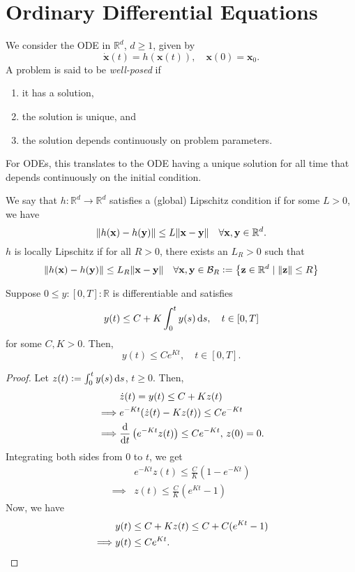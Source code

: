 \section{Ordinary Differential Equations}

We consider the ODE in $\mathbb{R}^d$, $d \geq 1$, given by
\[
    \dot{\mathbf{x}}(t) = h(\mathbf{x}(t)), \quad \mathbf{x}(0) = \mathbf{x}_0.
\]
A problem is said to be \emph{well-posed} if 
\begin{enumerate}
    \item it has a solution, 
    \item the solution is unique, and
    \item the solution depends continuously on problem parameters. 
\end{enumerate}

For ODEs, this translates to the ODE having a unique solution for all time that depends continuously on the initial condition.

\medskip

We say that $h \colon \mathbb{R}^d \to \mathbb{R}^d$ satisfies a (global) Lipschitz condition if for some $L > 0$, we have
\[
    \norm{h(\mathbf{x}) - h(\mathbf{y})} \leq L \norm{\mathbf{x} - \mathbf{y}} \quad \forall \mathbf{x},\mathbf{y} \in \mathbb{R}^d. 
\]
$h$ is locally Lipschitz if for all $R > 0$, there exists an $L_R > 0$ such that
\[
    \norm{h(\mathbf{x}) - h(\mathbf{y})} \leq L_R \norm{\mathbf{x} - \mathbf{y}} \quad \forall \mathbf{x},\mathbf{y} \in \mathcal{B}_R \vcentcolon= \left\{ \mathbf{z} \in \mathbb{R}^d \mid \norm{\mathbf{z}} \leq R  \right\}
\]

\begin{lem}
    Suppose $0 \leq y \colon [0,T] \colon \mathbb{R}$ is differentiable and satisfies
    \[
        y(t) \leq C + K \int_0^t y(s) \, \mathrm{d} s, \quad t \in [0,T]
    \]
    for some $C,K > 0$. Then, 
    \[
        y(t) \leq Ce^{Kt}, \quad t \in [0,T].
    \]
\end{lem}

\begin{proof}
    Let $z(t) \vcentcolon= \int_0^t y(s) \, \mathrm{d} s$, $t \geq 0$. Then, 
    \begin{align*}
        &\dot{z}(t) = y(t) \leq C + Kz(t) \\
        \implies &e^{-Kt}(\dot{z}(t) - Kz(t)) \leq Ce^{-Kt} \\
        \implies & \frac{\mathrm{d}}{\mathrm{d} t} \left( e^{-Kt} z(t) \right) \leq Ce^{-Kt}, \, z(0) = 0.
    \end{align*}
    Integrating both sides from $0$ to $t$, we get
    \begin{align*}
        &e^{-Kt} z(t) \leq \frac{C}{K} (1 - e^{-Kt}) \\
        \implies &z(t) \leq \frac{C}{K} (e^{Kt} - 1)
    \end{align*}
    Now, we have
    \begin{align*}
        &y(t) \leq C + Kz(t) \leq C + C(e^{Kt} - 1) \\
        \implies & y(t) \leq Ce^{Kt}. \qedhere
    \end{align*}
\end{proof}

